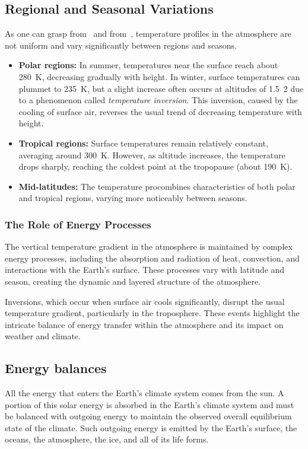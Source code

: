 \subsection{Regional and Seasonal Variations}

As one can grasp from~\fig{\ref{fig:temp-profile-dobson}} and from~\tabref{\ref{tab:atm-temps-layer-latitude}}, temperature profiles in the atmosphere are not uniform and vary significantly between regions and seasons.

\begin{itemize}
	\item \textbf{Polar regions:} In summer, temperatures near the surface reach about 280~K, decreasing gradually with height. In winter, surface temperatures can plummet to 235~K, but a slight increase often occurs at altitudes of \qty{1.5}{2}{\kilo\meter} due to a phenomenon called \emph{temperature inversion}. This inversion, caused by the cooling of surface air, reverses the usual trend of decreasing temperature with height.
	\item \textbf{Tropical regions:} Surface temperatures remain relatively constant, averaging around 300~K. However, as altitude increases, the temperature drops sharply, reaching the coldest point at the tropopause (about 190~K).
	\item \textbf{Mid-latitudes:} The temperature pro\file combines characteristics of both polar and tropical regions, varying more noticeably between seasons.
\end{itemize}


\subsubsection*{The Role of Energy Processes}

The vertical temperature gradient in the atmosphere is maintained by complex energy processes, including the absorption and radiation of heat, convection, and interactions with the Earth's surface. These processes vary with latitude and season, creating the dynamic and layered structure of the atmosphere.

Inversions, which occur when surface air cools significantly, disrupt the usual temperature gradient, particularly in the troposphere. These events highlight the intricate balance of energy transfer within the atmosphere and its impact on weather and climate.

\subsection{Energy balances}\label{subsec:energy-balances}
All the energy that enters the Earth’s climate system comes from the sun.
A portion of this solar energy is absorbed in the Earth's climate system and must be balanced with
outgoing energy to maintain the observed overall equilibrium state of the climate.
Such outgoing energy is emitted by the Earth's surface, the oceans, the atmosphere, the ice, and all of its life forms.

